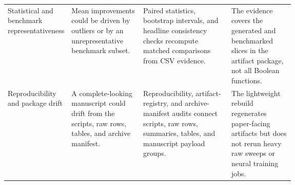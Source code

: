 \begin{tabularx}{\linewidth}{>{\raggedright\arraybackslash}p{0.18\linewidth}>{\raggedright\arraybackslash}p{0.25\linewidth}>{\raggedright\arraybackslash}X>{\raggedright\arraybackslash}p{0.22\linewidth}}
Statistical and benchmark representativeness & Mean improvements could be driven by outliers or by an unrepresentative benchmark subset. & Paired statistics, bootstrap intervals, and headline consistency checks recompute matched comparisons from CSV evidence. & The evidence covers the generated and benchmarked slices in the artifact package, not all Boolean functions. \\
Reproducibility and package drift & A complete-looking manuscript could drift from the scripts, raw rows, tables, and archive manifest. & Reproducibility, artifact-registry, and archive-manifest audits connect scripts, raw rows, summaries, tables, and manuscript payload groups. & The lightweight rebuild regenerates paper-facing artifacts but does not rerun heavy raw sweeps or neural training jobs. \\
\bottomrule
\end{tabularx}
